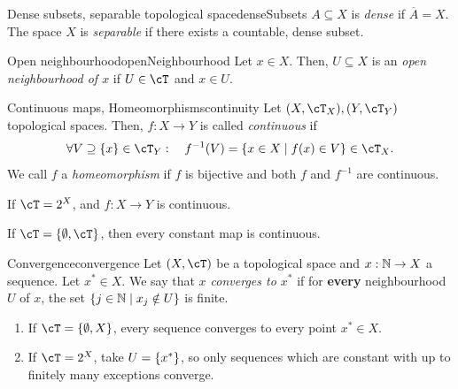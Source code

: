 \documentclass[language=english]{../../Template/TemplateLecture}
\begin{document}
\begin{defi}{Dense subsets, separable topological space}{denseSubsets}
    $A \subseteq X$ is \emph{dense} if $\overline{A} = X$. The space $X$ is \emph{separable} if there exists a countable, dense
    subset.
\end{defi}

\begin{defi}{Open neighbourhood}{openNeighbourhood}
    Let $x \in X$. Then, $U \subseteq X$ is an \emph{open neighbourhood of $x$} if $U \in \cT$ and $x \in U$.  
\end{defi}

\begin{defi}{Continuous maps, Homeomorphisms}{continuity}
    Let $(X, \cT_X), (Y, \cT_Y)$ topological spaces. Then, $f: X \to Y$ is called \emph{continuous} if
    \begin{equation}
        \forall V \supseteq \set{x} \in \cT_Y: \quad f^{-1}(V) = \set{x \in X \mid f(x) \in V} \in \cT_X.
    \end{equation}
    We call $f$ a \emph{homeomorphism} if $f$ is bijective and both $f$ and $f^{-1}$ are continuous.
\end{defi}

If $\cT = 2^X$, and $f: X \to Y$ is continuous.

If $\cT = \set{\emptyset, \cT}$, then every constant map is continuous.





\begin{defi}{Convergence}{convergence}
    Let $(X, \cT)$ be a topological space and $x: \mathbb{N} \to X$ a sequence. Let $x^* \in X$. We say that \emph{$x$ converges to $x^*$} if for \textbf{every} neighbourhood $U$ of $x$, the set $\{j \in \mathbb{N} \mid x_j \notin U\}$ is finite.
\end{defi}

\begin{beispiel}
    \begin{enumerate}[$(i)$]
        \item If $\cT = \set{\emptyset, X}$, every sequence converges to every point $x^* \in X$.
        \item If $\cT = 2^X$, take $U = \{x^*\}$, so only sequences which are constant with up to finitely many exceptions converge.
    \end{enumerate}
\end{beispiel}
\end{document}
